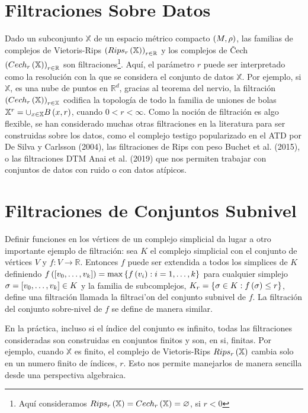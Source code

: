 \section*{Filtraciones Sobre Datos}

Dado un subconjunto $\mathbb{X}$ de un espacio m\'etrico compacto $\left(M,\rho\right)$, las familias de
complejos de Vietoris-Rips $\left(Rips_{r}\left(\mathbb{X}\right)\right)_{r\in\mathbb{R}}$ y los complejos de \v Cech
$\left(Cech_{r}\left(\mathbb{X}\right)\right)_{r\in\mathbb{R}}$ son filtraciones\footnote{Aqu\'i consideramos
$Rips_{r}\left(\mathbb{X}\right) = Cech_{r}\left(\mathbb{X}\right) = \varnothing$, si $r<0$}. Aqu\'i, el par\'ametro
$r$ puede ser interpretado como la resoluci\'on con la que se considera el conjunto de datos $\mathbb{X}$.
Por ejemplo, si $\mathbb{X}$, es una nube de puntos en $\mathbb{R}^{d}$, gracias al teorema del nervio,
la filtraci\'on $\left(Cech_{r}\left(\mathbb{X}\right)\right)_{r\in\mathbb{X}}$ codifica la topolog\'ia de todo la
familia de uniones de bolas $\mathbb{X}^{r} = \cup_{x\in\mathbb{X}}B\left(x,r\right)$, cuando $0<r<\infty$.
Como la noci\'on de filtraci\'on es algo flexible, se han considerado muchas otras filtraciones en la
literatura para ser construidas sobre los datos, como el complejo testigo popularizado en el ATD por
De Silva y Carlsson (2004)\cite{DeSilva2004}, las filtraciones de Rips con peso Buchet et al.
(2015)\cite{Buchet2015b}, o las filtraciones DTM Anai et al. (2019)\cite{Anai2019} que nos permiten
trabajar con conjuntos de datos con ruido o con datos at\'ipicos.

\section*{Filtraciones de Conjuntos Subnivel}

Definir funciones en los v\'ertices de un complejo simplicial da lugar a otro importante ejemplo de
filtraci\'on: sea $K$ el complejo simplicial con el conjunto de v\'ertices $V$ y
$f:V\rightarrow\mathbb{R}$. Entonces $f$ puede ser extendida a todos los simplices de $K$ definiendo
$f\left(\left[v_{0},\dots,v_{k}\right]\right) = \max\left\{f\left(v_{i}\right): i=1,\dots,k\right\}$ para cualquier simplejo
$\sigma = \left[v_{0},\dots,v_{k}\right]\in K$ y la familia de subcomplejos,
$K_{r}=\left\{\sigma\in K:f\left(\sigma\right)\leq r\right\}$, define una filtraci\'on llamada la filtraci'on del
conjunto subnivel de $f$. La filtraci\'on del conjunto sobre-nivel de $f$ se define de manera similar.

En la pr\'actica, incluso si el \'indice del conjunto es infinito, todas las filtraciones consideradas
son construidas en conjuntos finitos y son, en si, finitas. Por ejemplo, cuando $\mathbb{X}$ es finito,
el complejo de Vietoris-Rips $Rips_{r}\left(\mathbb{X}\right)$ cambia solo en un numero finito de \'indices,
$r$. Esto nos permite manejarlos de manera sencilla desde una perspectiva algebraica.

